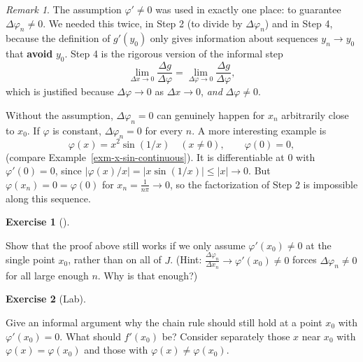 \documentclass[
  letterpaper,
  DIV=11,
  numbers=noendperiod]{scrreprt}
\theoremstyle{plain}
\theoremstyle{plain}
\theoremstyle{definition}
\theoremstyle{definition}
\newtheorem{exercise}{Exercise}[chapter]
\theoremstyle{definition}
\theoremstyle{plain}
\theoremstyle{plain}
\theoremstyle{remark}
\newtheorem{refremark}{Remark}[chapter]
\begin{document}
\begin{refremark}
The assumption \(\varphi'\neq0\) was used in exactly one place: to
guarantee \(\Delta\varphi_n\neq0\). We needed this twice, in Step 2 (to
divide by \(\Delta\varphi_n\)) and in Step 4, because the definition of
\(g'(y_0)\) only gives information about sequences \(y_n\to y_0\) that
\textbf{avoid} \(y_0\). Step 4 is the rigorous version of the informal
step \[
\lim_{\Delta x\to0}\frac{\Delta g}{\Delta\varphi} = \lim_{\Delta\varphi\to0}\frac{\Delta g}{\Delta\varphi},
\] which is justified because \(\Delta\varphi\to0\) as \(\Delta x\to0\),
\emph{and} \(\Delta\varphi\neq0\).

Without the assumption, \(\Delta\varphi_n=0\) can genuinely happen for
\(x_n\) arbitrarily close to \(x_0\). If \(\varphi\) is constant,
\(\Delta\varphi_n = 0\) for every \(n\). A more interesting example is
\[
\varphi(x) = x^2\sin(1/x)\quad(x\neq0), \qquad \varphi(0)=0,
\] (compare Example~\ref{exm-x-sin-continuous}). It is differentiable at
\(0\) with \(\varphi'(0)=0\), since
\(\lvert \varphi(x)/x \rvert = \lvert x\sin(1/x) \rvert\le\lvert x \rvert\to0\).
But \(\varphi(x_n) = 0 = \varphi(0)\) for \(x_n = \frac{1}{n\pi}\to0\),
so the factorization of Step 2 is impossible along this sequence.

\label{rem-where-used}

\end{refremark}

\begin{exercise}[]\protect\hypertarget{exr-chain-pointwise}{}\label{exr-chain-pointwise}

Show that the proof above still works if we only assume
\(\varphi'(x_0)\neq0\) at the single point \(x_0\), rather than on all
of \(J\). (Hint:
\(\frac{\Delta\varphi_n}{\Delta x_n}\to\varphi'(x_0)\neq0\) forces
\(\Delta\varphi_n\neq0\) for all large enough \(n\). Why is that
enough?)

\end{exercise}

\begin{exercise}[Lab]\protect\hypertarget{exr-chain-lab}{}\label{exr-chain-lab}

Give an informal argument why the chain rule should still hold at a
point \(x_0\) with \(\varphi'(x_0)=0\). What should \(f'(x_0)\) be?
Consider separately those \(x\) near \(x_0\) with
\(\varphi(x)=\varphi(x_0)\) and those with
\(\varphi(x)\neq\varphi(x_0)\).

\end{exercise}
\end{document}
